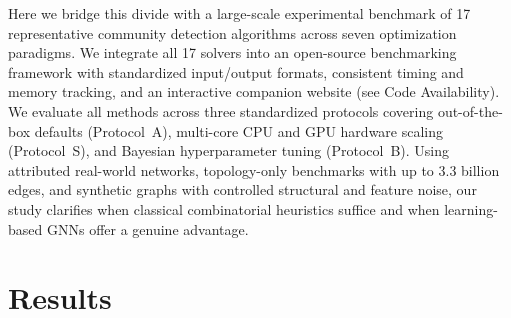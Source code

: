 \documentclass[11pt,a4paper]{article}
\begin{document}
Here we bridge this divide with a large-scale experimental benchmark of 17 representative community detection algorithms across seven optimization paradigms. We integrate all 17 solvers into an open-source benchmarking framework with standardized input/output formats, consistent timing and memory tracking, and an interactive companion website (see Code Availability). We evaluate all methods across three standardized protocols covering out-of-the-box defaults (Protocol~A), multi-core CPU and GPU hardware scaling (Protocol~S), and Bayesian hyperparameter tuning (Protocol~B). Using attributed real-world networks, topology-only benchmarks with up to 3.3 billion edges, and synthetic graphs with controlled structural and feature noise, our study clarifies when classical combinatorial heuristics suffice and when learning-based GNNs offer a genuine advantage.

\section{Results}\label{sec:results}\label{sec:experiments}
\end{document}

